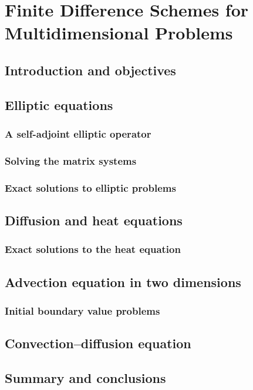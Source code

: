 \chapter{Finite Difference Schemes for Multidimensional Problems}

\section{Introduction and objectives}

\section{Elliptic equations}

\subsection{A self-adjoint elliptic operator}

\subsection{Solving the matrix systems}

\subsection{Exact solutions to elliptic problems}

\section{Diffusion and heat equations}

\subsection{Exact solutions to the heat equation}

\section{Advection equation in two dimensions}

\subsection{Initial boundary value problems}

\section{Convection–diffusion equation}

\section{Summary and conclusions}